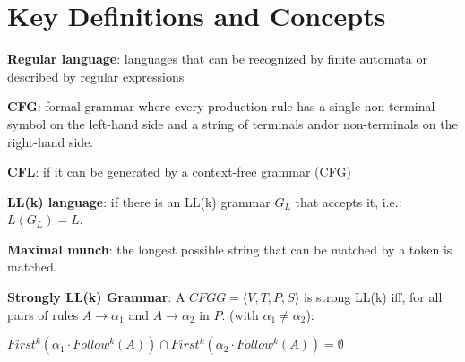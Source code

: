 \section{Key Definitions and Concepts}
\textbf{Regular language}: languages that can be recognized by finite automata or described by regular expressions

\textbf{CFG}: formal grammar where every production rule has a single non-terminal symbol on the left-hand side and a string of terminals and\/or non-terminals on the right-hand side.

\textbf{CFL}: if it can be generated by a context-free grammar (CFG)

\textbf{LL(k) language}: if there is an LL(k) grammar $G_L$ that accepts it, i.e.: $L(G_L )= L$.

\textbf{Maximal munch}: the longest possible string that can be matched by a token is matched.


\textbf{Strongly LL(k) Grammar}: A $CFG G = \langle V ,T ,P,S \rangle $ is strong LL(k) iff, for all pairs of rules $A \rightarrow \alpha_1$ and $A \rightarrow \alpha_2$ in $P$. (with $\alpha_1 \neq \alpha_2$): 

$First^k (\alpha_1 \cdot Follow^k (A)) \cap First^k (\alpha_2 \cdot Follow^k (A)) = \emptyset$